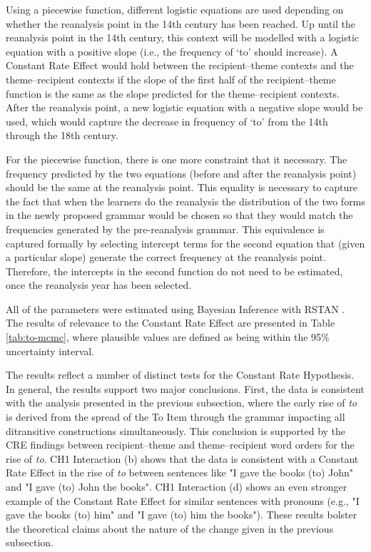 	Using a piecewise function, different logistic equations are used depending on whether the reanalysis point in the 14th century has been reached. Up until the reanalysis point in the 14th century, this context will be modelled with a logistic equation with a positive slope (i.e., the frequency of `to' should increase). A Constant Rate Effect would hold between the recipient--theme contexts and the theme--recipient contexts if the slope of the first half of the recipient--theme function is the same as the slope predicted for the theme--recipient contexts. After the reanalysis point, a new logistic equation with a negative slope would be used, which would capture the decrease in frequency of `to' from the 14th through the 18th century.

	For the piecewise function, there is one more constraint that it necessary. The frequency predicted by the two equations (before and after the reanalysis point) should be the same at the reanalysis point. This equality is necessary to capture the fact that when the learners do the reanalysis the distribution of the two forms in the newly proposed grammar would be chosen so that they would match the frequencies generated by the pre-reanalysis grammar. This equivalence is captured formally by selecting intercept terms for the second equation that (given a particular slope) generate the correct frequency at the reanalysis point. Therefore, the intercepts in the second function do not need to be estimated, once the reanalysis year has been selected.

	All of the parameters were estimated using Bayesian Inference with RSTAN \citep{stan.2016}. The results of relevance to the Constant Rate Effect are presented in Table \ref{tab:to-mcmc}, where plausible values are defined as being within the 95\% uncertainty interval.



   The results reflect a number of distinct tests for the Constant Rate Hypothesis. In general, the results support two major conclusions. First, the data is consistent with the analysis presented in the previous subsection, where the early rise of \textit{to} is derived from the spread of the To Item through the grammar impacting all ditransitive constructions simultaneously. This conclusion is supported by the CRE findings between recipient--theme and theme--recipient word orders for the rise of \textit{to}. CH1 Interaction (b) shows that the data is consistent with a Constant Rate Effect in the rise of \textit{to} between sentences like "I gave the books (to) John" and "I gave (to) John the books". CH1 Interaction (d) shows an even stronger example of the Constant Rate Effect for similar sentences with pronouns (e.g., "I gave the books (to) him" and "I gave (to) him the books"). These results bolster the theoretical claims about the nature of the change given in the previous subsection.

